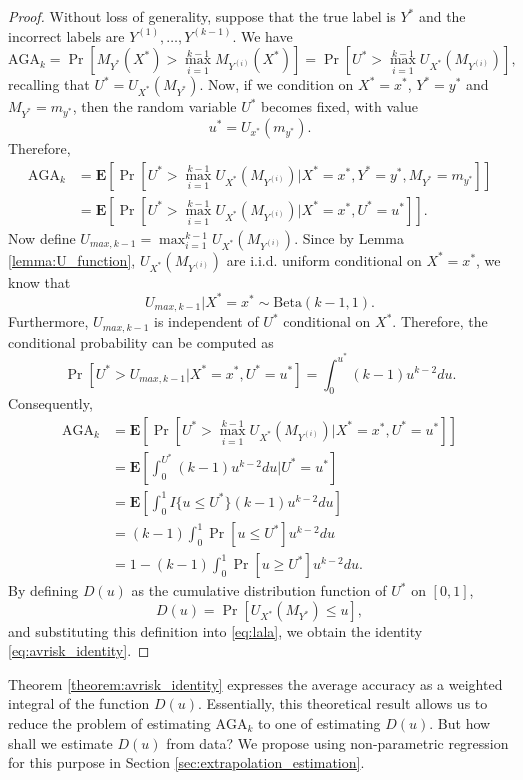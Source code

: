 \documentclass[twoside,11pt]{article}
\newcommand{\E}{\textbf{E}}
\begin{document}
\begin{proof} Without loss of generality, suppose that the true label is $Y^*$ and
the incorrect labels are $Y^{(1)},\hdots, Y^{(k-1)}$.  We have
\[
\text{AGA}_k = \Pr[M_{Y^*}(X^*) > \max_{i=1}^{k-1} M_{Y^{(i)}}(X^*)]
= \Pr[U^* > \max_{i=1}^{k-1} U_{X^*}(M_{Y^{(i)}})],
\]
recalling that $U^* = U_{X^*}(M_{Y^*})$.  Now, if we condition on $X^*
= x^*$, $Y^* = y^*$ and $M_{Y^*} = m_{y^*}$, then the random variable
$U^*$ becomes fixed, with value
\[
u^* = U_{x^*}(m_{y^*}).
\]
Therefore,
\begin{align*}
\text{AGA}_k &=\E[\Pr[U^* > \max_{i=1}^{k-1} U_{X^*}(M_{Y^{(i)}})|X^* = x^*, Y^* = y^*, M_{Y^*} = m_{y^*}]]
\\&= \E[\Pr[U^* > \max_{i=1}^{k-1} U_{X^*}(M_{Y^{(i)}})|X^* = x^*, U^* = u^*]].
\end{align*}
Now define $U_{max, k-1} = \max_{i=1}^{k-1} U_{X^*}(M_{Y^{(i)}})$. 
Since by Lemma \ref{lemma:U_function},
$U_{X^*}(M_{Y^{(i)}})$ are i.i.d. uniform conditional on $X^* = x^*$, we know that
\begin{equation}\label{eq:umax_beta}
U_{max, k-1}|X^* = x^* \sim \text{Beta}(k-1, 1). 
\end{equation}
Furthermore, $U_{max, k-1}$ is independent of $U^*$ conditional on
$X^*$.  Therefore, the conditional probability can be computed as
\[
\Pr[U^* > U_{max, k-1}|X^* = x^*, U^* = u^*] = \int_0^{u^*} (k-1) u^{k-2} du.
\]
Consequently,
\begin{align}
\text{AGA}_k &= \E[\Pr[U^* > \max_{i=1}^{k-1} U_{X^*}(M_{Y^{(i)}})|X^* = x^*, U^* = u^*]]
\\&= \E[\int_0^{U^*} (k-1) u^{k-2} du|U^* = u^*]
\\&= \E[\int_0^1 I\{u \leq U^*\} (k-1) u^{k-2} du ]
\\&= (k-1) \int_0^1 \Pr[u \leq U^*] u^{k-2} du
\\&= 1 - (k-1) \int_0^1 \Pr[u \geq U^*] u^{k-2} du. \label{eq:lala}
\end{align}
By defining ${D}(u)$ as the cumulative distribution function of
$U^*$ on $[0,1]$,
\begin{equation}\label{eq:Kbar}
{D}(u) = \Pr[U_{X^*}(M_{Y^*}) \leq u],
\end{equation}
and substituting this definition into \eqref{eq:lala}, we obtain the identity \eqref{eq:avrisk_identity}.
\end{proof}


Theorem \ref{theorem:avrisk_identity} expresses the average accuracy
as a weighted integral of the function ${D}(u)$.  Essentially, this theoretical result allows us
to reduce the problem of estimating $\text{AGA}_k$ to one of estimating $D(u)$.
But how shall we estimate $D(u)$ from data?
We propose using non-parametric regression for this purpose in Section \ref{sec:extrapolation_estimation}.
\end{document}
